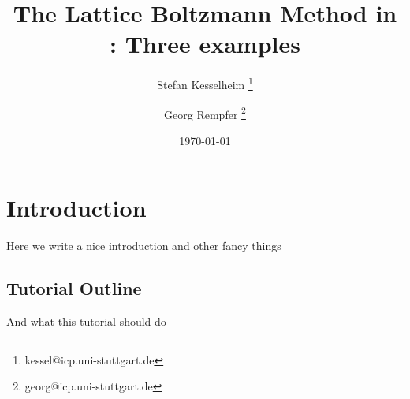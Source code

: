 \subject{ESPResSo Tutorial}
\title{The Lattice Boltzmann Method in \ES{}: Three examples } \author{ Stefan Kesselheim \thanks{\ttfamily 
kessel@icp.uni-stuttgart.de}  \and  Georg Rempfer \thanks{\ttfamily 
georg@icp.uni-stuttgart.de}}
\date{\today}
\publishers{Institute for Computational Physics, Stuttgart University}

\maketitle \tableofcontents


\chapter{Introduction}
Here we write a nice introduction and other fancy things 


\section{Tutorial Outline}

And what this tutorial should do

